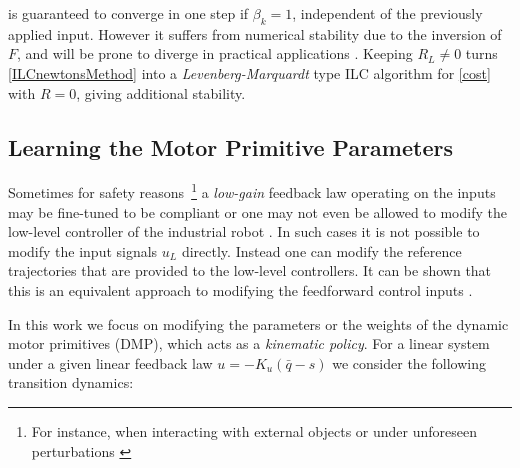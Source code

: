 \documentclass[10pt,a4paper]{article}
\newcommand{\todo}{\textcolor{red}{TODO}} %
\newcommand{\joint}{q} %
\newcommand{\state}{\bar{\joint}} %
\newcommand{\dmp}{s} %
\newcommand{\error}{e} %
\newcommand{\sysInput}{u} %
\begin{document}
is guaranteed to converge in one step if $\beta_k = 1$, independent of the previously applied input. However it suffers from numerical stability due to the inversion of $F$, and will be prone to diverge in practical applications \cite{Bristow06}. Keeping $R_L \neq 0$ turns \eqref{ILCnewtonsMethod} into a \emph{Levenberg-Marquardt} type ILC algorithm for \eqref{cost} with $R = 0$, giving additional stability. 


\subsection{Learning the Motor Primitive Parameters}

Sometimes for safety reasons~\footnote{For instance, when interacting with external objects or under unforeseen perturbations \cite{Schaal07}} a \emph{low-gain} feedback law operating on the inputs may be fine-tuned to be compliant or one may not even be allowed to modify the low-level controller of the industrial robot \cite{Longman2000}. In such cases it is not possible to modify the input signals $\sysInput_L$ directly. Instead one can modify the reference trajectories that are provided to the low-level controllers. It can be shown that this is an equivalent approach to modifying the feedforward control inputs \cite{Bristow06}.

In this work we focus on modifying the parameters or the weights of the dynamic motor primitives (DMP), which acts as a \emph{kinematic policy}. For a linear system under a given linear feedback law $\sysInput = -K_u(\state - \dmp)$ we consider the following transition dynamics:
\end{document}
